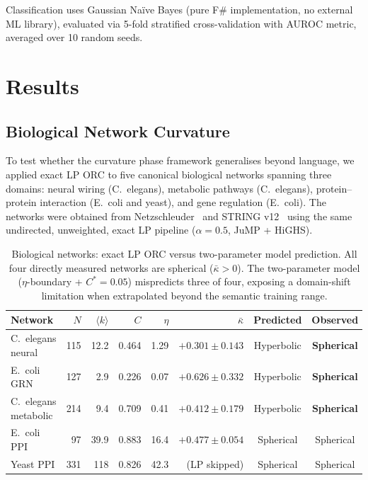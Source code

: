 \documentclass[11pt,a4paper]{article}
\newcommand{\kbar}{\bar{\kappa}}
\begin{document}
Classification uses Gaussian Na\"ive Bayes (pure F\# implementation, no external ML library), evaluated via 5-fold stratified cross-validation with AUROC metric, averaged over 10 random seeds.

\section{Results}
\label{sec:results}

\subsection{Biological Network Curvature}
\label{sec:bio_results}

To test whether the curvature phase framework generalises beyond language, we applied exact LP ORC to five canonical biological networks spanning three domains: neural wiring (C.\ elegans), metabolic pathways (C.\ elegans), protein--protein interaction (E.\ coli and yeast), and gene regulation (E.\ coli). The networks were obtained from Netzschleuder~\cite{peixoto2020netzschleuder} and STRING v12~\cite{szklarczyk2023string} using the same undirected, unweighted, exact LP pipeline ($\alpha = 0.5$, JuMP + HiGHS).

\begin{table}[h]
\centering
\small
\caption{Biological networks: exact LP ORC versus two-parameter model prediction. All four directly measured networks are spherical ($\kbar > 0$). The two-parameter model ($\eta$-boundary + $C^* = 0.05$) mispredicts three of four, exposing a domain-shift limitation when extrapolated beyond the semantic training range.}
\label{tab:bio}
\begin{tabular}{@{}lrrrrrcc@{}}
\toprule
Network & $N$ & $\langle k \rangle$ & $C$ & $\eta$ & $\kbar$ & Predicted & Observed \\
\midrule
C.\ elegans neural   & 115 & 12.2 & 0.464 & 1.29 & $+0.301 \pm 0.143$ & Hyperbolic & \textbf{Spherical} \\
E.\ coli GRN         & 127 &  2.9 & 0.226 & 0.07 & $+0.626 \pm 0.332$ & Hyperbolic & \textbf{Spherical} \\
C.\ elegans metabolic & 214 &  9.4 & 0.709 & 0.41 & $+0.412 \pm 0.179$ & Hyperbolic & \textbf{Spherical} \\
E.\ coli PPI         &  97 & 39.9 & 0.883 & 16.4 & $+0.477 \pm 0.054$ & Spherical  & Spherical \\
Yeast PPI            & 331 & 118  & 0.826 & 42.3 & (LP skipped)       & Spherical  & Spherical \\
\bottomrule
\end{tabular}
\end{table}
\end{document}
